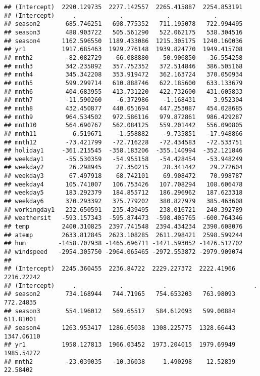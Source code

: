 \documentclass[]{article}
\begin{document}
\begin{verbatim}
## (Intercept)  2290.129735  2277.142557  2265.415887  2254.853191
## (Intercept)     .            .            .            .       
## season2       685.746251   698.775352   711.195078   722.994495
## season3       488.903722   505.561290   522.062175   538.304516
## season4      1162.596550  1189.433086  1215.305175  1240.160036
## yr1          1917.685463  1929.276148  1939.824770  1949.415708
## mnth2         -82.082729   -66.088880   -50.906850   -36.554258
## mnth3         342.235892   357.752352   372.514846   386.505168
## mnth4         345.342208   353.919472   362.163724   370.050934
## mnth5         599.299714   610.888746   622.185600   633.133679
## mnth6         404.683955   413.731220   422.732600   431.605833
## mnth7         -11.590260    -6.372986    -1.168431     3.952304
## mnth8         432.450877   440.051694   447.253087   454.028685
## mnth9         964.534502   972.586116   979.872861   986.429287
## mnth10        564.690767   562.084125   559.201442   556.090805
## mnth11          6.519671    -1.558882    -9.735851   -17.948866
## mnth12        -73.421799   -72.716228   -72.434583   -72.533751
## holiday1     -361.215545  -358.183206  -355.140994  -352.121846
## weekday1      -55.530359   -54.955158   -54.428454   -53.948249
## weekday2       26.298945    27.350215    28.341442    29.272604
## weekday3       67.497918    68.742101    69.908472    70.998787
## weekday4      105.741007   106.753426   107.708294   108.606478
## weekday5      183.292379   184.855712   186.296962   187.623318
## weekday6      370.293392   375.779202   380.827979   385.463608
## workingday1   232.650591   235.439495   238.016721   240.392789
## weathersit   -593.157343  -595.874473  -598.405765  -600.764346
## temp         2400.310825  2397.741548  2394.434234  2390.608076
## atemp        2633.812845  2623.108285  2611.298421  2598.599244
## hum         -1458.707938 -1465.696711 -1471.593052 -1476.512702
## windspeed   -2954.305750 -2964.065465 -2972.553872 -2979.909074
##                                                                          
## (Intercept)  2245.360455  2236.84722  2229.227372  2222.41966  2216.22242
## (Intercept)     .            .           .            .           .      
## season2       734.168944   744.71965   754.653203   763.98093   772.24835
## season3       554.196012   569.65517   584.612093   599.00884   611.81001
## season4      1263.953417  1286.65038  1308.225775  1328.66443  1347.06110
## yr1          1958.127813  1966.03452  1973.204015  1979.69949  1985.54272
## mnth2         -23.039035   -10.36038     1.490298    12.52839    22.58402

\end{verbatim}
\end{document}
